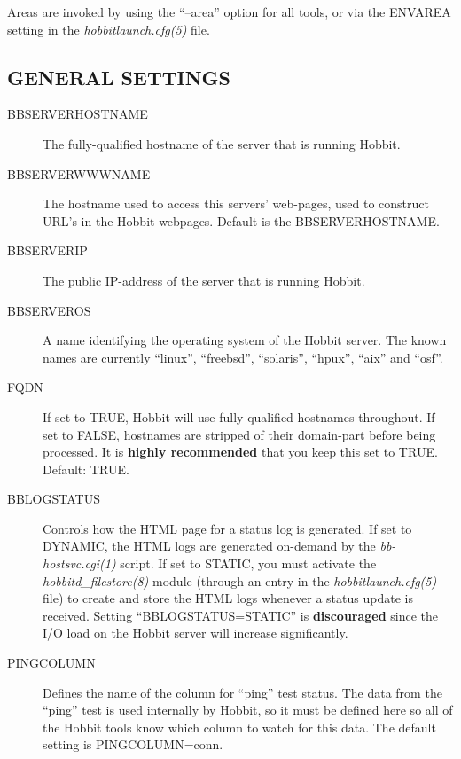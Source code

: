   Areas are invoked by using the ``--area'' option for all tools, or via the ENVAREA setting in the \emph{hobbitlaunch.cfg(5)}
 file. 


 
\subsection{GENERAL SETTINGS}


 \begin{description}
\item[BBSERVERHOSTNAME] The fully-qualified hostname of the server that is running Hobbit. 

 

\item[BBSERVERWWWNAME] The hostname used to access this servers' web-pages, used to construct URL's in the Hobbit webpages. Default is the BBSERVERHOSTNAME. 

 

\item[BBSERVERIP] The public IP-address of the server that is running Hobbit. 

 

\item[BBSERVEROS] A name identifying the operating system of the Hobbit server. The known names are currently ``linux'', ``freebsd'', ``solaris'', ``hpux'', ``aix'' and ``osf''. 

 

\item[FQDN] If set to TRUE, Hobbit will use fully-qualified hostnames throughout. If set to FALSE, hostnames are stripped of their domain-part before being processed. It is \textbf{highly recommended}
 that you keep this set to TRUE. Default: TRUE. 

 

\item[BBLOGSTATUS] Controls how the HTML page for a status log is generated. If set to DYNAMIC, the HTML logs are generated on-demand by the \emph{bb-hostsvc.cgi(1)}
 script. If set to STATIC, you must activate the \emph{hobbitd\_filestore(8)}
 module (through an entry in the \emph{hobbitlaunch.cfg(5)}
 file) to create and store the HTML logs whenever a status update is received. Setting ``BBLOGSTATUS=STATIC'' is \textbf{discouraged}
 since the I/O load on the Hobbit server will increase significantly. 

 

\item[PINGCOLUMN] Defines the name of the column for ``ping'' test status. The data from the ``ping'' test is used internally by Hobbit, so it must be defined here so all of the Hobbit tools know which column to watch for this data. The default setting is PINGCOLUMN=conn. 


\end{description}
